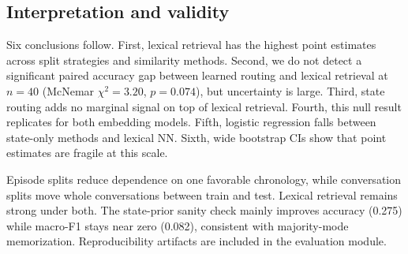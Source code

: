 \subsection{Interpretation and validity}

Six conclusions follow. First, lexical retrieval has the highest point estimates across split strategies and similarity methods. Second, we do not detect a significant paired accuracy gap between learned routing and lexical retrieval at $n=40$ (McNemar $\chi^2=3.20$, $p=0.074$), but uncertainty is large. Third, state routing adds no marginal signal on top of lexical retrieval. Fourth, this null result replicates for both embedding models. Fifth, logistic regression falls between state-only methods and lexical NN. Sixth, wide bootstrap CIs show that point estimates are fragile at this scale.

Episode splits reduce dependence on one favorable chronology, while conversation splits move whole conversations between train and test. Lexical retrieval remains strong under both. The state-prior sanity check mainly improves accuracy (0.275) while macro-F1 stays near zero (0.082), consistent with majority-mode memorization. Reproducibility artifacts are included in the evaluation module.
